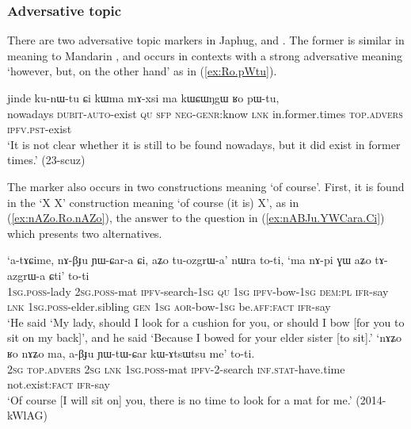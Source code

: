  \subsubsection{Adversative topic} \label{sec:adversative.topic}
There are two adversative topic markers in Japhug,  and . The former is similar in meaning to Mandarin , and occurs in contexts with a strong adversative meaning `however, but, on the other hand' as in (\ref{ex:Ro.pWtu}).

\begin{exe}
\ex \label{ex:Ro.pWtu}
\gll jinde ku-nɯ-tu ɕi kɯma mɤ-xsi ma kɯɕɯŋgɯ ʁo pɯ-tu, \\
nowadays \textsc{dubit}-\textsc{auto}-exist \textsc{qu} \textsc{sfp} \textsc{neg}-\textsc{genr}:know \textsc{lnk} in.former.times \textsc{top}.\textsc{advers} \textsc{ipfv}.\textsc{pst}-exist \\
\glt `It is not clear whether it is still to be found nowadays, but it did exist in former times.' (23-scuz)
\end{exe}

The marker  also occurs in two constructions meaning `of course'. First, it is found in the `X  X' construction meaning `of course (it is)  X', as in (\ref{ex:nAZo.Ro.nAZo}), the answer to the question in (\ref{ex:nABJu.YWCara.Ci}) which presents two alternatives.

\begin{exe}
\ex
\begin{xlist}
\ex  \label{ex:nABJu.YWCara.Ci}
\gll `a-tɤɕime, nɤ-βɟu ɲɯ-ɕar-a ɕi, aʑo tu-ozgrɯ-a' nɯra to-ti, `ma nɤ-pi ɣɯ aʑo tɤ-azgrɯ-a ɕti' to-ti  \\
\textsc{1sg}.\textsc{poss}-lady \textsc{2sg}.\textsc{poss}-mat \textsc{ipfv}-search-\textsc{1sg} \textsc{qu} \textsc{1sg} \textsc{ipfv}-bow-\textsc{1sg} \textsc{dem}:\textsc{pl} \textsc{ifr}-say \textsc{lnk} \textsc{1sg}.\textsc{poss}-elder.sibling \textsc{gen} \textsc{1sg} \textsc{aor}-bow-\textsc{1sg} be.\textsc{aff}:\textsc{fact} \textsc{ifr}-say \\
\glt `He said `My lady, should I look for a cushion for you, or should I bow [for you to sit on my back]', and he said  `Because I bowed for your elder sister [to sit].'
\ex  \label{ex:nAZo.Ro.nAZo}
\gll  `nɤʑo ʁo nɤʑo ma, a-βɟu ɲɯ-tɯ-ɕar kɯ-ɤtsɯtsu me' to-ti.   \\
\textsc{2sg} \textsc{top}.\textsc{advers} \textsc{2sg} \textsc{lnk} \textsc{1sg}.\textsc{poss}-mat \textsc{ipfv}-2-search \textsc{inf}.\textsc{stat}-have.time  not.exist:\textsc{fact} \textsc{ifr}-say \\
\glt  `Of course [I will sit on] you, there is no time to look for a mat for me.' (2014-kWlAG)
\end{xlist}
\end{exe}

